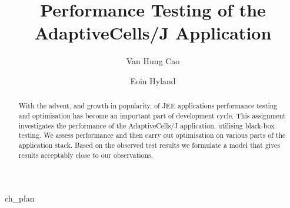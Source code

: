 \documentclass[10pt,a4paper,titlepage]{report}
\begin{document}
\title{Performance Testing of the AdaptiveCells/J Application}
\author{Van Hung Cao \and Eoin Hyland}
\maketitle

\begin{abstract}
With the advent, and growth in popularity, of JEE applications performance testing and optimisation has become an important part of development cycle. This assignment investigates the performance of the AdaptiveCells/J application, utilising black-box testing. We assess performance and then carry out optimisation on various parts of the application stack. Based on the observed test results we formulate a model that gives results acceptably close to our observations.
\end{abstract}




\tableofcontents





 {ch_plan}











\appendix










\end{document}
